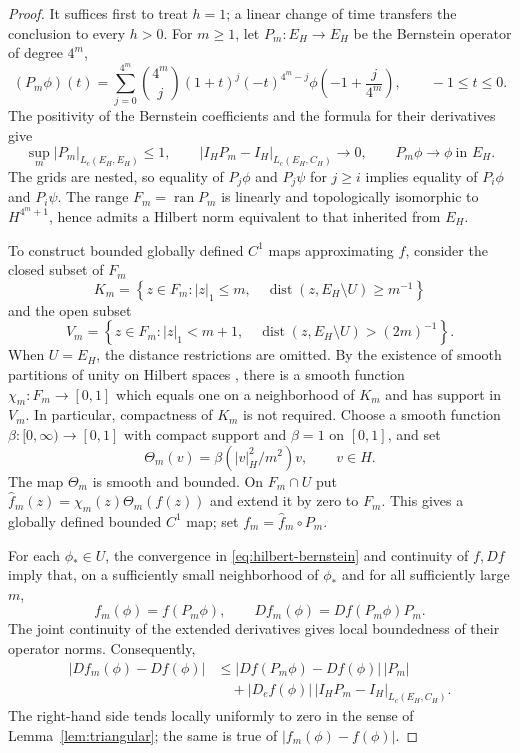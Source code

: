 \documentclass[11pt]{article}
\newcommand{\Lc}{L_c}
\newcommand{\dist}{\operatorname{dist}}
\begin{document}
\begin{proof}
It suffices first to treat $h=1$; a linear change of time
transfers the conclusion to every $h>0$. For $m\ge1$, let
$P_m:E_H\to E_H$ be the Bernstein operator of degree $4^m$,
\[
 (P_m\phi)(t)=\sum_{j=0}^{4^m}
 \binom{4^m}{j}(1+t)^j(-t)^{4^m-j}
 \phi\!\left(-1+\frac{j}{4^m}\right),
 \qquad -1\le t\le0.
\]
The positivity of the Bernstein coefficients and the formula
for their derivatives give
\begin{equation}\label{eq:hilbert-bernstein}
 \sup_m|P_m|_{L_c(E_H,E_H)}\le1,\qquad
 |I_HP_m-I_H|_{\Lc(E_H,C_H)}\longrightarrow0,\qquad
 P_m\phi\longrightarrow\phi\ \text{in }E_H.
\end{equation}
The grids are nested, so equality of $P_j\phi$ and $P_j\psi$
for $j\ge i$ implies equality of $P_i\phi$ and $P_i\psi$.
The range $F_m=\operatorname{ran}P_m$ is linearly and
topologically isomorphic to $H^{4^m+1}$, hence admits a Hilbert
norm equivalent to that inherited from $E_H$.

To construct bounded globally defined $C^1$ maps approximating $f$,
consider the closed subset of $F_m$
\[
 K_m=\left\{z\in F_m:|z|_1\le m,\quad
 \dist(z,E_H\setminus U)\ge m^{-1}\right\}
\]
and the open subset
\[
 V_m=\left\{z\in F_m:|z|_1<m+1,\quad
 \dist(z,E_H\setminus U)>(2m)^{-1}\right\}.
\]
When $U=E_H$, the distance restrictions are omitted.
By the existence of smooth partitions of unity
on Hilbert spaces \cite[Corollary 16.16]{KrieglMichor1997},
there is a  smooth
function $\chi_m:F_m\to[0,1]$ which equals one on a
neighborhood of $K_m$ and has support in $V_m$. In particular,
compactness of $K_m$ is not required.
Choose a smooth function $\beta:[0,\infty)\to[0,1]$
with compact support and $\beta=1$ on $[0,1]$, and set
\[
 \Theta_m(v)=\beta(|v|_H^2/m^2)v,\qquad v\in H.
\]
The map $\Theta_m$ is smooth and bounded. On $F_m\cap U$
put $\widehat f_m(z)=\chi_m(z)\Theta_m(f(z))$ and extend
it by zero to $F_m$. This gives a globally defined bounded
$C^1$ map; set $f_m=\widehat f_m\circ P_m$.

For each $\phi_*\in U$, the convergence in
\eqref{eq:hilbert-bernstein} and continuity of $f,Df$
imply that, on a sufficiently small neighborhood of $\phi_*$
and for all sufficiently large $m$,
\[
 f_m(\phi)=f(P_m\phi),\qquad
 Df_m(\phi)=Df(P_m\phi)P_m.
\]
The joint continuity of the extended derivatives gives local
boundedness of their operator norms. Consequently,
\begin{align*}
 |Df_m(\phi)-Df(\phi)|
 &\le |Df(P_m\phi)-Df(\phi)|\,|P_m|\\
 &\quad+|D_ef(\phi)|\,
       |I_HP_m-I_H|_{\Lc(E_H,C_H)}.
\end{align*}
The right-hand side tends locally uniformly to zero in the
sense of Lemma~\ref{lem:triangular}; the same is true of
$|f_m(\phi)-f(\phi)|$.


\end{proof}
\end{document}
